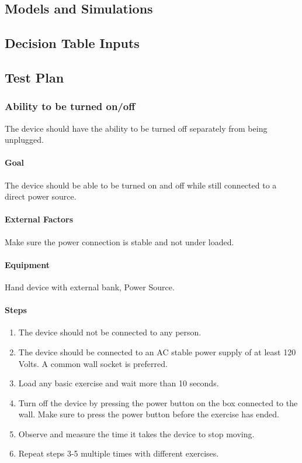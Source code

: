 \documentclass{article}
\begin{document}
\subsection{Models and Simulations}





\subsection{Decision Table Inputs}

\subsection{Test Plan}
\subsubsection{Ability to be turned on/off}
The device should have the ability to be turned off separately from being unplugged.

\paragraph{Goal} The device should be able to be turned on and off while still connected to a direct power source.

\paragraph{External Factors} Make sure the power connection is stable and not under loaded.

\paragraph{Equipment} Hand device with external bank, Power Source.

\paragraph{Steps}
\begin{enumerate}
\item The device should not be connected to any person.
\item The device should be connected to an AC stable power supply of at least 120 Volts. A common wall socket is preferred.
\item Load any basic exercise and wait more than 10 seconds.
\item Turn off the device by pressing the power button on the box connected to the wall. Make sure to press the power button before the exercise has ended.
\item Observe and measure the time it takes the device to stop moving.
\item Repeat steps 3-5 multiple times with different exercises.
\end{enumerate}
\end{document}
